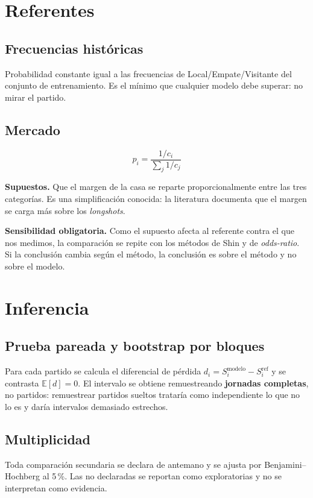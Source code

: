 \documentclass{pas}
\begin{document}
\section{Referentes}

\subsection{Frecuencias históricas}
Probabilidad constante igual a las frecuencias de Local/Empate/Visitante del conjunto de entrenamiento. Es el
mínimo que cualquier modelo debe superar: no mirar el partido.

\subsection{Mercado}
\begin{equation}
p_i = \frac{1/c_i}{\sum_{j} 1/c_j}
\end{equation}

\textbf{Supuestos.} Que el margen de la casa se reparte proporcionalmente entre las tres categorías. Es una
simplificación conocida: la literatura documenta que el margen se carga más sobre los \emph{longshots}.

\textbf{Sensibilidad obligatoria.} Como el supuesto afecta al referente contra el que nos medimos, la comparación
se repite con los métodos de Shin y de \emph{odds-ratio}. Si la conclusión cambia según el método, la conclusión
es sobre el método y no sobre el modelo.

\section{Inferencia}

\subsection{Prueba pareada y bootstrap por bloques}
Para cada partido se calcula el diferencial de pérdida $d_i = S_i^{\mathrm{modelo}} - S_i^{\mathrm{ref}}$ y se
contrasta $\mathbb{E}[d]=0$. El intervalo se obtiene remuestreando \textbf{jornadas completas}, no partidos:
remuestrear partidos sueltos trataría como independiente lo que no lo es y daría intervalos demasiado estrechos.

\subsection{Multiplicidad}
Toda comparación secundaria se declara de antemano y se ajusta por Benjamini--Hochberg al 5\,\%. Las no declaradas
se reportan como exploratorias y no se interpretan como evidencia.
\end{document}
